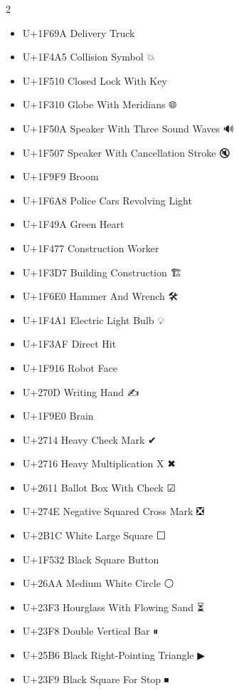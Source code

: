\begin{multicols}{2}
\begin{itemize}
    \item U+1F69A Delivery Truck                   🚚
    \item U+1F4A5 Collision Symbol                 💥
    \item U+1F510 Closed Lock With Key             🔐
    \item U+1F310 Globe With Meridians             🌐
    \item U+1F50A Speaker With Three Sound Waves   🔊
    \item U+1F507 Speaker With Cancellation Stroke 🔇
    \item U+1F9F9 Broom                            🧹
    \item U+1F6A8 Police Cars Revolving Light      🚨
    \item U+1F49A Green Heart                      💚
    \item U+1F477 Construction Worker              👷
    \item U+1F3D7 Building Construction            🏗
    \item U+1F6E0 Hammer And Wrench                🛠
    \item U+1F4A1 Electric Light Bulb              💡
    \item U+1F3AF Direct Hit                       🎯
    \item U+1F916 Robot Face                       🤖
    \item U+270D  Writing Hand                     ✍
    \item U+1F9E0 Brain                            🧠
    \item U+2714  Heavy Check Mark                 ✔
    \item U+2716  Heavy Multiplication X           ✖
    \item U+2611  Ballot Box With Check            ☑
    \item U+274E  Negative Squared Cross Mark      ❎
    \item U+2B1C  White Large Square               ⬜
    \item U+1F532 Black Square Button              🔲
    \item U+26AA  Medium White Circle              ⚪
    \item U+23F3  Hourglass With Flowing Sand      ⏳
    \item U+23F8  Double Vertical Bar              ⏸
    \item U+25B6  Black Right-Pointing Triangle    ▶
    \item U+23F9  Black Square For Stop            ⏹

\end{itemize}
\end{multicols}
